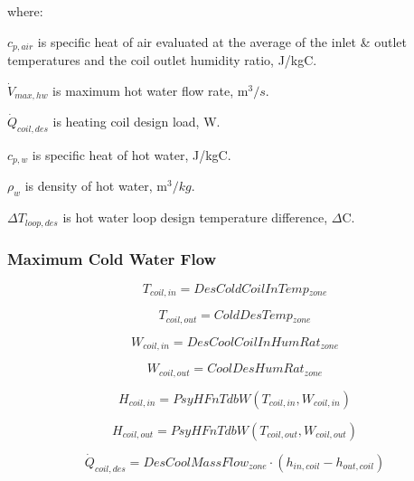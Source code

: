 where:

\(c_{p,air}\) is specific heat of air evaluated at the average of the inlet \& outlet temperatures and the coil outlet humidity ratio, J/kgC.

\(\dot{V}_{max,hw}\) is maximum hot water flow rate, m$^{3}/s$.

\(\dot{Q}_{coil,des}\) is heating coil design load, W.

\(c_{p,w}\) is specific heat of hot water, J/kgC.

\(\rho_{w}\) is density of hot water, m$^{3}/kg$.

\(\Delta T_{loop,des}\) is hot water loop design temperature difference, \(\Delta\)C.


\subsubsection{Maximum Cold Water Flow}\label{maximum-cold-water-flow}

\begin{equation}
\textit{T\(_{coil,in}\)} = \textit{DesColdCoilInTemp\(_{zone}\)}
\end{equation}

\begin{equation}
\textit{T\(_{coil,out}\)} = \textit{ColdDesTemp\(_{zone}\)}
\end{equation}

\begin{equation}
\textit{W\(_{coil,in}\)} = \textit{DesCoolCoilInHumRat\(_{zone}\)}
\end{equation}

\begin{equation}
\textit{W\(_{coil,out}\)} = \textit{CoolDesHumRat\(_{zone}\)}
\end{equation}

\begin{equation}
\textit{H\(_{coil,in}\)} = \textit{PsyHFnTdbW}(\textit{T\(_{coil,in}\)}, \textit{W\(_{coil,in}\)})
\end{equation}

\begin{equation}
\textit{H\(_{coil,out}\)} = \textit{PsyHFnTdbW}(\textit{T\(_{coil,out}\)}, \textit{W\(_{coil,out}\)})
\end{equation}

\begin{equation}
\dot{Q}_{coil,des} = DesCoolMassFlow_{zone} \cdot (h_{in,coil} - h_{out,coil})
\end{equation}

